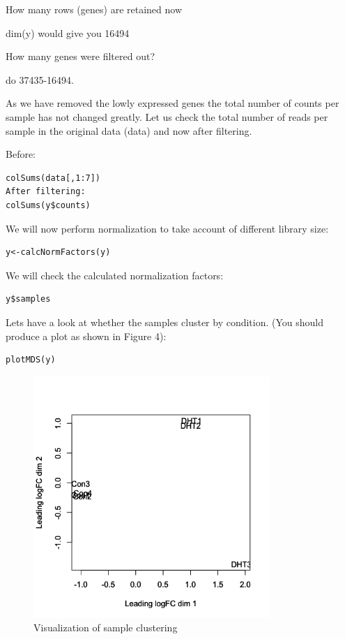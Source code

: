 \begin{questions}
How many rows (genes) are retained now
\begin{answer}
dim(y) would give you 16494
\end{answer}

How many genes were filtered out?
\begin{answer}
do 37435-16494.
\end{answer}
\end{questions}


As we have removed the lowly expressed genes the total number of counts per sample has not changed greatly. Let us check the total number of reads per sample in the original data (data) and now after filtering.

\begin{steps}
Before:	


\begin{lstlisting}
colSums(data[,1:7])
After filtering:
colSums(y$counts)
\end{lstlisting}
\end{steps}


\begin{steps}
We will now perform normalization to take account of different library size:
\begin{lstlisting}
y<-calcNormFactors(y)
\end{lstlisting}

We will check the calculated normalization factors:
\begin{lstlisting}
y$samples
\end{lstlisting}

Lets have a look at whether the samples cluster by condition. (You should produce a plot
as shown in Figure 4):
\begin{lstlisting}
plotMDS(y)
\end{lstlisting}
\end{steps}

\begin{figure}[H]
\centering
\includegraphics[width=0.8\textwidth]{handout/MDS.png}
\caption{Visualization of sample clustering}
\label{fig:MDS plot}
\end{figure}

